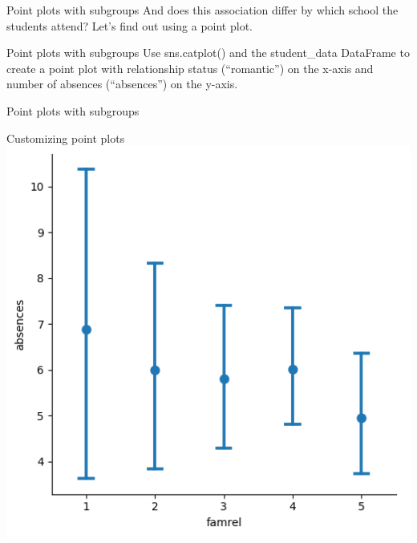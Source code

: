 \documentclass[
  ignorenonframetext,
]{beamer}
\newenvironment{Shaded}{\begin{snugshade}}{\end{snugshade}}
\begin{document}
\begin{frame}{Point plots with subgroups}
\label{point-plots-with-subgroups-1}
And does this association differ by which school the students attend?
Let's find out using a point plot.
\end{frame}

\begin{frame}{Point plots with subgroups}
\label{point-plots-with-subgroups-2}
Use sns.catplot() and the student\_data DataFrame to create a point plot
with relationship status (``romantic'') on the x-axis and number of
absences (``absences'') on the y-axis.
\end{frame}

\begin{frame}[fragile]{Point plots with subgroups}
\label{point-plots-with-subgroups-3}

\begin{Shaded}
\begin{Highlighting}[]

\end{Highlighting}
\end{Shaded}
\end{frame}

\begin{frame}{Customizing point plots}
\label{customizing-point-plots-10}
\includegraphics{../images/im292.png}
\end{frame}
\end{document}
